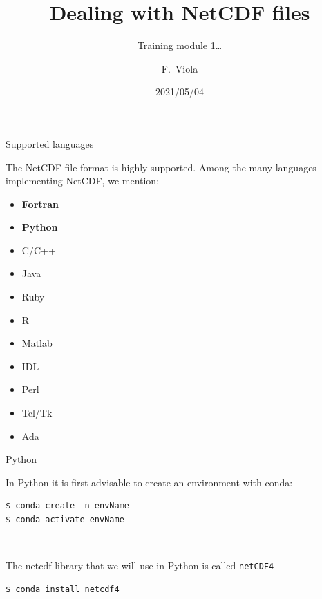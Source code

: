\documentclass[9pt]{beamer}
\title{Dealing with NetCDF files}
\subtitle{Training module 1\dots}
\date{2021/05/04}
\begin{document}
\author[Viola] %
{F.~Viola}



\maketitle

\begin{frame}[fragile]{Supported languages}

The NetCDF file format is highly supported. Among the many languages implementing NetCDF, we mention:

\begin{itemize}
    \item \textbf{Fortran}
    \item \textbf{Python}
    \item C/C++
    \item Java
    \item Ruby
    \item R
    \item Matlab
    \item IDL
    \item Perl
    \item Tcl/Tk
    \item Ada
\end{itemize}
\end{frame}

\begin{frame}[fragile]{Python}

In Python it is first advisable to create an environment with conda:

\begin{verbatim}
$ conda create -n envName
$ conda activate envName
\end{verbatim}

\pause

\ 

The netcdf library that we will use in Python is called \texttt{netCDF4}

\begin{verbatim}
$ conda install netcdf4
\end{verbatim}

\end{frame}
\end{document}
